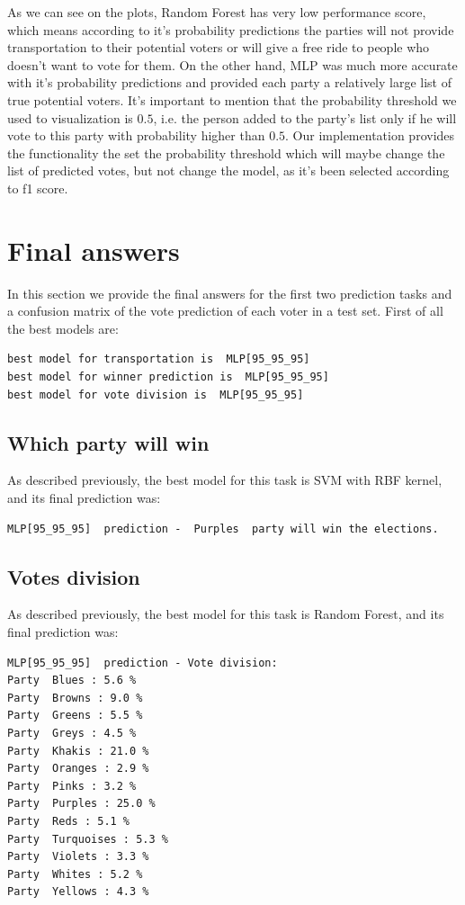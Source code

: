 \documentclass[12pt]{article}
\begin{document}
As we can see on the plots, Random Forest has very low performance score, which means according to it's probability predictions the parties will not provide transportation to their potential voters or will give a free ride to people who doesn't want to vote for them. On the other hand, MLP was much more accurate with it's probability predictions and provided each party a relatively large list of true potential voters. It's important to mention that the probability threshold we used to visualization is $0.5$, i.e. the person added to the party's list only if he will vote to this party with probability higher than $0.5$. Our implementation provides the functionality the set the probability threshold which will maybe change the list of predicted votes, but not change the model, as it's been selected according to f1 score. 


\newpage
\section{Final answers}
In this section we provide the final answers for the first two prediction tasks and a confusion matrix of the vote prediction of each voter in a test set. First of all the best models are:

\begin{verbatim}
best model for transportation is  MLP[95_95_95]
best model for winner prediction is  MLP[95_95_95]
best model for vote division is  MLP[95_95_95]
\end{verbatim}

\subsection{Which party will win}
As described previously, the best model for this task is SVM with RBF kernel, and its final prediction was:
\begin{verbatim}
MLP[95_95_95]  prediction -  Purples  party will win the elections.
\end{verbatim}

\subsection{Votes division}
As described previously, the best model for this task is Random Forest, and its final prediction was:
\begin{verbatim}
MLP[95_95_95]  prediction - Vote division:
Party  Blues : 5.6 %
Party  Browns : 9.0 %
Party  Greens : 5.5 %
Party  Greys : 4.5 %
Party  Khakis : 21.0 %
Party  Oranges : 2.9 %
Party  Pinks : 3.2 %
Party  Purples : 25.0 %
Party  Reds : 5.1 %
Party  Turquoises : 5.3 %
Party  Violets : 3.3 %
Party  Whites : 5.2 %
Party  Yellows : 4.3 %
\end{verbatim}
\end{document}
